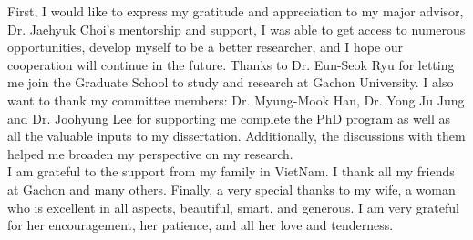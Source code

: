 
\begin{acknowledgements}       
First, I would like to express my gratitude and appreciation to my major advisor, Dr. Jaehyuk Choi’s mentorship and support, I was able to get access to numerous opportunities, develop myself to be a better researcher, and I hope our cooperation will continue in the future. Thanks to Dr. Eun-Seok Ryu for letting me join the Graduate School to study and research at Gachon University. I also want to thank my committee members: Dr. Myung-Mook Han, Dr. Yong Ju Jung and Dr. Joohyung Lee for supporting me complete the PhD program as well as all the valuable inputs to my dissertation. Additionally, the discussions with them helped me broaden my perspective on my research.\\
I am grateful to the support from my family in VietNam. I thank all my friends at Gachon and many others.
Finally, a very special thanks to my wife, a woman who is excellent in
all aspects, beautiful, smart, and generous. I am very grateful for her encouragement, her patience, and all her love and tenderness.
\end{acknowledgements}
